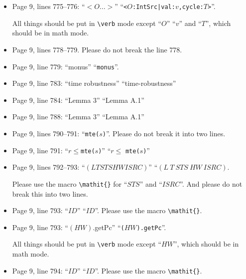 \documentclass[12pt,onecolumn]{IEEEtranTIE}
\begin{document}
\begin{itemize}
``\verb|monus|'' should be put in \verb|\verb| mode and there should
  be spaces before and after ``\verb|monus|''.

\item Page 9, lines 775--776: ``$<O...>$'' \by
  ``\verb|<|$O$\verb+:IntSrc|val:+$v$\verb|,cycle:|$T$\verb|>|''. 

All things should be put in \verb|\verb| mode except ``$O$'' ``$v$''
and ``$T$'', which should be in math mode.

\item Page 9, lines 778--779. Please do not break the line 778.

\item Page 9, line 779: ``monus'' \by ``\verb|monus|''.

\item Page 9, line 783: ``time robustness'' \by ``time-robustness''

\item Page 9, line 784: ``Lemma 3'' \by ``Lemma A.1''

\item Page 9, line 788: ``Lemma 3'' \by ``Lemma A.1''

\item Page 9, lines 790--791: ``\verb|mte(|$s$\verb|)|''. Please do
  not break it into two lines.

\item Page 9, line 791: ``$r\le$\verb|mte(|$s$\verb|)|'' \by ``$r\le$
  \verb|mte(|$s$\verb|)|''

\item Page 9, lines 792--793: ``$(LTSTSHW ISRC)$'' \by
  ``$(L~T~\mathit{STS}~\mathit{HW}~\mathit{ISRC})$. 

Please use the macro \verb|\mathit{}| for ``$\mathit{STS}$'' and
``$\mathit{ISRC}$''. And please do not break this into two lines.

\item Page 9, line 793: ``$ID$'' \by ``$\mathit{ID}$''. Please use the
  macro \verb|\mathit{}|.

\item Page 9, line 793: ``$(HW)$.getPc'' \by
  ``\verb|(|$HW$\verb|).getPc|''. 

All things should be put in \verb|\verb| mode except ``$HW$'', which
should be in math mode.

\item Page 9, line 794: ``$ID$'' \by ``$\mathit{ID}$''. Please use the
  macro \verb|\mathit{}|.




\end{itemize}
\end{document}
